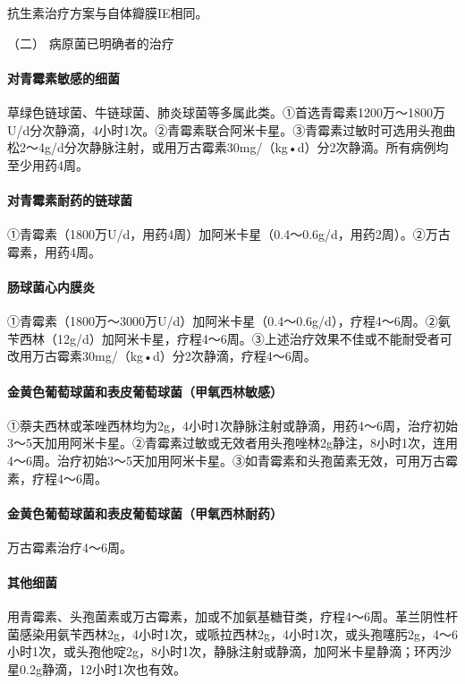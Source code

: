 抗生素治疗方案与自体瓣膜IE相同。

\hypertarget{text00300.htmlux5cux23CHP10-3-3-2-2}{}
（二） 病原菌已明确者的治疗

\paragraph{对青霉素敏感的细菌}

草绿色链球菌、牛链球菌、肺炎球菌等多属此类。①首选青霉素1200万～1800万U/d分次静滴，4小时1次。②青霉素联合阿米卡星。③青霉素过敏时可选用头孢曲松2～4g/d分次静脉注射，或用万古霉素30mg/（kg•d）分2次静滴。所有病例均至少用药4周。

\paragraph{对青霉素耐药的链球菌}

①青霉素（1800万U/d，用药4周）加阿米卡星（0.4～0.6g/d，用药2周）。②万古霉素，用药4周。

\paragraph{肠球菌心内膜炎}

①青霉素（1800万～3000万U/d）加阿米卡星（0.4～0.6g/d），疗程4～6周。②氨苄西林（12g/d）加阿米卡星，疗程4～6周。③上述治疗效果不佳或不能耐受者可改用万古霉素30mg/（kg•d）分2次静滴，疗程4～6周。

\paragraph{金黄色葡萄球菌和表皮葡萄球菌（甲氧西林敏感）}

①萘夫西林或苯唑西林均为2g，4小时1次静脉注射或静滴，用药4～6周，治疗初始3～5天加用阿米卡星。②青霉素过敏或无效者用头孢唑林2g静注，8小时1次，连用4～6周。治疗初始3～5天加用阿米卡星。③如青霉素和头孢菌素无效，可用万古霉素，疗程4～6周。

\paragraph{金黄色葡萄球菌和表皮葡萄球菌（甲氧西林耐药）}

万古霉素治疗4～6周。

\paragraph{其他细菌}

用青霉素、头孢菌素或万古霉素，加或不加氨基糖苷类，疗程4～6周。革兰阴性杆菌感染用氨苄西林2g，4小时1次，或哌拉西林2g，4小时1次，或头孢噻肟2g，4～6小时1次，或头孢他啶2g，8小时1次，静脉注射或静滴，加阿米卡星静滴；环丙沙星0.2g静滴，12小时1次也有效。

